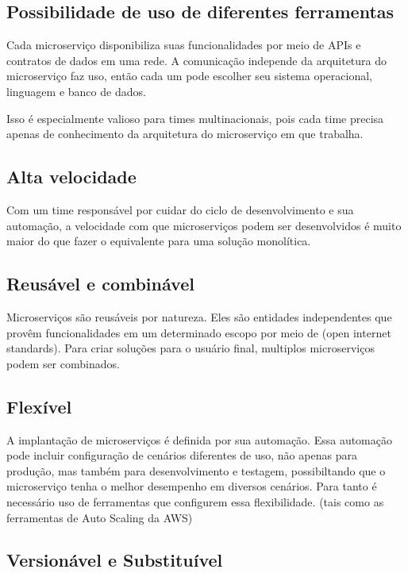 \subsection{Possibilidade de uso de diferentes ferramentas}

Cada microserviço disponibiliza suas funcionalidades por meio de APIs e contratos de dados em uma rede. A comunicação independe da arquitetura do microserviço faz uso, então cada um pode escolher seu sistema operacional, linguagem e banco de dados.

Isso é especialmente valioso para times multinacionais, pois cada time precisa apenas de conhecimento da arquitetura do microserviço em que trabalha.

\subsection{Alta velocidade}

Com um time responsável por cuidar do ciclo de desenvolvimento e sua automação, a velocidade com que microserviços podem ser desenvolvidos é muito maior do que fazer o equivalente para uma solução monolítica.

\subsection{Reusável e combinável}

Microserviços são reusáveis por natureza. Eles são entidades independentes que provêm funcionalidades em um determinado escopo por meio de (open internet standards). Para criar soluções para o usuário final, multiplos microserviços podem ser combinados.

\subsection{Flexível}

A implantação de microserviços é definida por sua automação. Essa automação pode incluir configuração de cenários diferentes de uso, não apenas para produção, mas também para desenvolvimento e testagem, possibiltando que o microserviço tenha o melhor desempenho em diversos cenários. Para tanto é necessário uso de ferramentas que configurem essa flexibilidade. (tais como as ferramentas de Auto Scaling da AWS)

\subsection{Versionável e Substituível}

